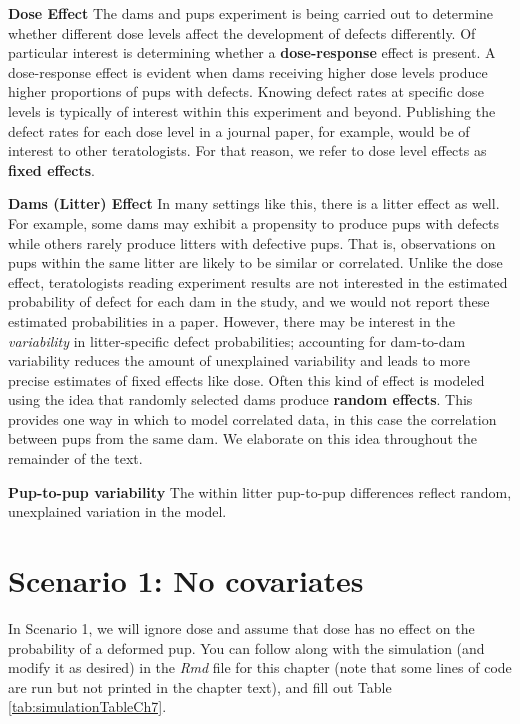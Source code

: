 \documentclass[
]{krantz}
\begin{document}
\textbf{Dose Effect} The dams and pups experiment is being carried out to determine whether different dose levels affect the development of defects differently. Of particular interest is determining whether a \textbf{dose-response} effect is present. A dose-response effect is evident when dams receiving higher dose levels produce higher proportions of pups with defects. Knowing defect rates at specific dose levels is typically of interest within this experiment and beyond. Publishing the defect rates for each dose level in a journal paper, for example, would be of interest to other teratologists. For that reason, we refer to dose level effects as \textbf{fixed effects}.

\textbf{Dams (Litter) Effect} In many settings like this, there is a litter effect as well. For example, some dams may exhibit a propensity to produce pups with defects while others rarely produce litters with defective pups. That is, observations on pups within the same litter are likely to be similar or correlated. Unlike the dose effect, teratologists reading experiment results are not interested in the estimated probability of defect for each dam in the study, and we would not report these estimated probabilities in a paper. However, there may be interest in the \emph{variability} in litter-specific defect probabilities; accounting for dam-to-dam variability reduces the amount of unexplained variability and leads to more precise estimates of fixed effects like dose. Often this kind of effect is modeled using the idea that randomly selected dams produce \textbf{random effects}. This provides one way in which to model correlated data, in this case the correlation between pups from the same dam. We elaborate on this idea throughout the remainder of the text.

\textbf{Pup-to-pup variability} The within litter pup-to-pup differences reflect random, unexplained variation in the model.

\hypertarget{scenario-1-no-covariates}{%
\section{Scenario 1: No covariates}\label{scenario-1-no-covariates}}

In Scenario 1, we will ignore dose and assume that dose has no effect on the probability of a deformed pup. You can follow along with the simulation (and modify it as desired) in the \emph{Rmd} file for this chapter (note that some lines of code are run but not printed in the chapter text), and fill out Table \ref{tab:simulationTableCh7}.
\end{document}
